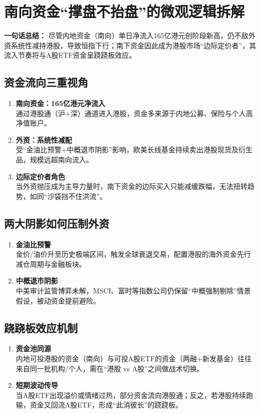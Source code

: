 \section{南向资金“撑盘不抬盘”的微观逻辑拆解}
\textbf{一句话总结：}  
{\color{red}尽管内地资金（南向）单日净流入165亿港元创阶段新高，仍不敌外资系统性减持港股，导致恒指下行；南下资金因此成为港股市场“边际定价者”，其流入节奏将与A股ETF资金呈跷跷板效应。}

\subsection{资金流向三重视角}
\begin{enumerate}[leftmargin=*, nosep]
    \item \textbf{南向资金：165亿港元净流入}  \\
    通过港股通（沪+深）通道进入港股，资金多来源于内地公募、保险与个人高净值账户。
    \item \textbf{外资：系统性减配}  \\
    {\color{red}受“金油比预警+中概退市阴影”影响，欧美长线基金持续卖出港股现货及衍生品，规模远超南向流入。}
    \item \textbf{边际定价者角色}  \\
    当外资抛压成为主导力量时，南下资金的边际买入只能减缓跌幅，无法扭转趋势，如同“沙袋挡不住洪流”。
\end{enumerate}

\subsection{两大阴影如何压制外资}
\begin{enumerate}[leftmargin=*, nosep]
    \item \textbf{金油比预警}  \\
    金价/油价升至历史极端区间，触发全球衰退交易，配置港股的海外资金先行减仓周期与金融板块。
    \item \textbf{中概退市阴影}  \\
    中美审计监管博弈未解，MSCI、富时等指数公司仍保留“中概强制剔除”情景假设，被动资金提前避险。
\end{enumerate}

\subsection{跷跷板效应机制}
\begin{enumerate}[leftmargin=*, nosep]
    \item \textbf{资金池同源}  \\
    内地可投港股的资金（南向）与可投A股ETF的资金（两融+新发基金）往往来自同一批机构/个人，需在“港股 vs A股”之间做战术切换。
    \item \textbf{短期波动传导}  \\
    {\color{red}当A股ETF出现溢价或情绪过热，部分资金流向港股通；反之，若港股持续跑输，资金又回流A股ETF，形成“此消彼长”的跷跷板。}
\end{enumerate}

